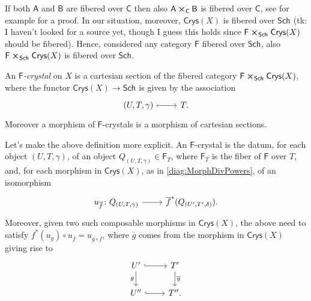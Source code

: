 \documentclass[../Main]{subfiles}
\begin{document}
\begin{rem}[]
	If both $\mathsf{A}$ and $\mathsf{B}$ are fibered over $\mathsf{C}$ then
	also $\mathsf{A} \cross_{ \mathsf{C} } \mathsf{B}$ is fibered over $\mathsf{C}$,
	see for example
	\cite[\href{https://stacks.math.columbia.edu/tag/02XQ}{Lemma 02XQ}]{SP}
	for a proof.
	In our situation, moreover, $\mathsf{Crys}(X)$ is fibered over $\mathsf{Sch}_{  }$
	(tk: I haven't looked for a source yet, though I guess this holds since
	$\mathsf{F} \cross_{ \mathsf{Sch}_{  } } \mathsf{Crys}(X)$ should be fibered).
	Hence, considered any category $\mathsf{F}$ fibered over $\mathsf{Sch}_{  }$,
	also $\mathsf{F} \cross_{ \mathsf{Sch}_{  } } \mathsf{Crys}(X)$
	is fibered over $\mathsf{Sch}_{ }$.
\end{rem}


\begin{defn}
	An {\em $\mathsf{F}$-crystal} on $X$ is a
	cartesian section of the fibered category
	$\mathsf{F} \cross_{ \mathsf{Sch}_{  } } \mathsf{Crys}(X)$, where
	the functor $\mathsf{Crys}(X) \to \mathsf{Sch}_{  }$ is given
	by the association
	\begin{equation*}
	\begin{tikzcd}[row sep = 0ex
		,/tikz/column 1/.append style={anchor=base east}
		,/tikz/column 2/.append style={anchor=base west}]
		\left(U, T, \gamma\right) \arrow[r, "", mapsto] & T
	.\end{tikzcd}
	\end{equation*} 
	Moreover a morphism of $\mathsf{F}$-crystals is a
	morphism of cartesian sections.
\end{defn}


\begin{rem}[]
	Let's make the above definition more explicit.
	An $\mathsf{F}$-crystal is the datum, for each object
	$\left(U, T, \gamma\right)$, of an object
	$Q_{\left(U, T, \gamma\right)} \in \mathsf{F}_T$, where
	$\mathsf{F}_T$ is the fiber of $\mathsf{F}$ over $T$,
	and, for each morphism in $\mathsf{Crys}(X)$, as in \cref{diag:MorphDivPowers},
	of an isomorphism
	\begin{equation*}
	\begin{tikzcd}[row sep = 0ex
		,/tikz/column 1/.append style={anchor=base east}
		,/tikz/column 2/.append style={anchor=base west}]
		u_{\overline{f}}\colon 
		Q_{\left(U, T, \gamma\right)}
		\arrow[r, "", rightarrow] &
		\overline{f}^* (Q_{\left(U', T', \delta \right)})
	.\end{tikzcd}
	\end{equation*} 
	Moreover, given two such composable morphisms in $\mathsf{Crys}(X)$,
	the above need to satisfy $f^*(u_{\overline{g}}) \circ u_{\overline{f}} =
	u_{\overline{g} \circ \overline{f}}$,
	where $\overline{g}$ comes from the morphism
	in $\mathsf{Crys}(X)$ giving rise to
	\begin{equation*}
	\begin{tikzcd}
		U' \arrow[d, "g"', rightarrow] \arrow[r, "", hookrightarrow] &
		T' \arrow[d, "\overline{g}", rightarrow] \\
		U'' \arrow[r, "", hookrightarrow] &
		T''
	.\end{tikzcd}
	\end{equation*}
\end{rem}
\end{document}

